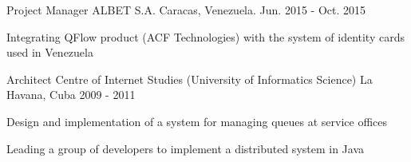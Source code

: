 \begin{cventries}

\cventry
{Project Manager} %
{ALBET S.A.} %
{Caracas, Venezuela.} %
{Jun. 2015 - Oct. 2015} %
{ %
\begin{cvitems}
\item {Integrating QFlow product (ACF Technologies) with the system of identity cards used in Venezuela}
\end{cvitems}
}


\cventry
{Architect} %
{Centre of Internet Studies (University of Informatics Science)} %
{La Havana, Cuba} %
{2009 - 2011} %
{ %
\begin{cvitems}
\item {Design and implementation of a system for managing queues at service offices}
\item {Leading a group of developers to implement a distributed system in Java}
\end{cvitems}
}


\end{cventries}
